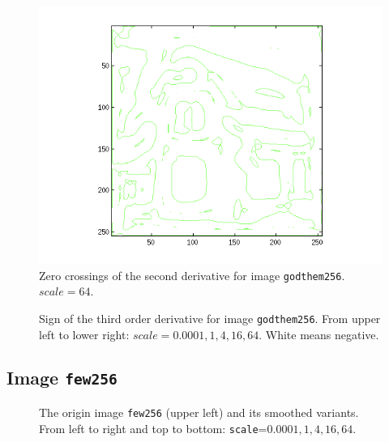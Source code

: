 \begin{figure}[H]
	\centering
	\includegraphics[scale=0.8]{./images/Q4/vv/64.png}
	\caption{Zero crossings of the second derivative for image \texttt{godthem256}. $scale = 64$.}
	\label{fig:Q4_vv_64}
\end{figure}


\begin{figure}[H]
	\centering
	\scalebox{0.8}{}
	\caption{Sign of the third order derivative for image \texttt{godthem256}.
  From upper left to lower right: $scale = 0.0001, 1, 4, 16, 64$. White means negative.}
	\label{fig:Q4_vvv_}
\end{figure}


\subsection{Image \texttt{few256}}

\begin{figure}[H]
	\centering
  \scalebox{0.8}{}
  \caption{The origin image \texttt{few256} (upper left) and its smoothed variants.
    From left to right and top to bottom: \texttt{scale}=$0.0001, 1, 4, 16, 64$.}
	\label{fig:Q5_smoothed_few256}
\end{figure}

